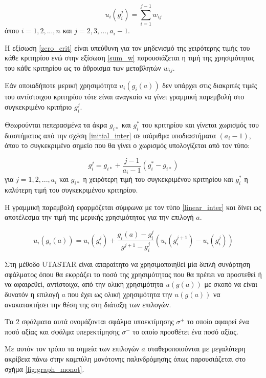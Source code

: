 \documentclass[11pt,a4paper,titlepage]{article}
\numberwithin{equation}{section}
\begin{document}
\begin{equation}\label{sum_w}
	u_{i}(g^{j}_{i}) = \sum_{i=1}^{j-1} w_{ij}
\end{equation}
όπου $i = 1,2,...,n$ και $j = 2,3,...,a_{i}-1$.

\newpage

Η εξίσωση \ref{zero_crit} είναι υπεύθυνη για τον μηδενισμό της χειρότερης τιμής του κάθε κριτηρίου ενώ στην εξίσωση \ref{sum_w} παρουσιάζεται η τιμή της χρησιμότητας του κάθε κριτηρίου ως το άθροισμα των μεταβλητών $w_{ij}$.  

Εάν οποιαδήποτε μερική χρησιμότητα $u_{i}(g_{i}(a))$ δεν υπάρχει στις διακριτές τιμές του αντίστοιχου κριτηρίου τότε είναι αναγκαίο να γίνει γραμμική παρεμβολή στο συγκεκριμένο κριτήριο $g_{i}^{j}$. 

Θεωρούνται πεπερασμένα τα άκρα $g_{i*}$ και $g^{*}_{i}$ του κριτηρίου και γίνεται χωρισμός του διαστήματος από την σχέση \ref{initial_inter} σε ισάριθμα υποδιαστήματα $(a_{i}-1)$, όπου το συγκεκριμένο σημείο που θα γίνει ο χωρισμός υπολογίζεται από τον τύπο:

\begin{equation}
	g_{i}^{j} = g_{i*} + \frac{j-1}{a_{i}-1}(g^{*}_{i}-g_{i*})
\end{equation}
για $j = 1,2,...,a_{i}$ και $g_{i*}$ η χειρότερη τιμή του συγκεκριμένου κριτηρίου και $g^{*}_{i}$ η καλύτερη τιμή του συγκεκριμένου κριτηρίου.

Η γραμμική παρεμβολή εφαρμόζεται σύμφωνα με τον τύπο \ref{linear_inter} και δίνει ως αποτέλεσμα την τιμή της μερικής χρησιμότητας για την επιλογή $a$.

\begin{equation}\label{linear_inter}
	u_{i}(g_{i}(a)) = u_{i}(g^{j}_{i}) + \frac{g_{i}(a)-g^{j}_{i}}{g^{j+1}-g^{j}_{i}}(u_{i}(g_{i}^{j+1})-u_{i}(g_{i}^{j}))
\end{equation}


Στη μέθοδο UTASTAR είναι απαραίτητο να χρησιμοποιηθεί μία διπλή συνάρτηση σφάλματος όπου θα εκφράζει το ποσό της χρησιμότητας που θα πρέπει να προστεθεί ή να αφαιρεθεί, αντίστοιχα, από την ολική χρησιμότητα $u(g(a))$ με σκοπό να είναι δυνατόν η επιλογή $a$ που έχει ως ολική χρησιμότητα την $u(g(a))$ να ανακατακτήσει την θέση της στη διάταξη των επιλογών.

Τα 2 σφάλματα αυτά ονομάζονται σφάλμα υποεκτίμησης $σ^{+}$ το οποίο αφαιρεί ένα ποσό αξίας και σφάλμα υπερεκτίμησης $σ^{-}$ το οποίο προσθέτει ένα ποσό αξίας.

Με αυτόν τον τρόπο τα σημεία των επιλογών $a$ σταθεροποιούνται με μεγαλύτερη ακρίβεια πάνω στην καμπύλη μονότονης παλινδρόμησης όπως παρουσιάζεται στο σχήμα \ref{fig:graph_monot}.
\end{document}
